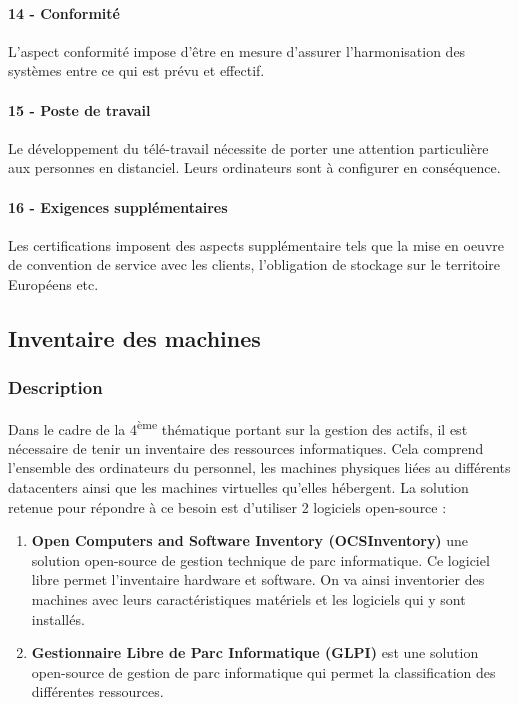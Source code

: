 \documentclass[12pt]{article}
\begin{document}
\paragraph{14 - Conformité} 
L'aspect conformité impose d'être en mesure d'assurer l'harmonisation des systèmes entre ce qui est prévu et effectif. 
\paragraph{15 - Poste de travail} 
Le développement du télé-travail nécessite de porter une attention particulière aux personnes en distanciel. 
Leurs ordinateurs sont à configurer en conséquence.
\paragraph{16 - Exigences supplémentaires} 
Les certifications imposent des aspects supplémentaire tels que la mise en oeuvre de convention de service avec les clients, l'obligation de stockage sur le territoire Européens etc.

\newpage
\subsection{Inventaire des machines}
\subsubsection{Description}

Dans le cadre de la 4\textsuperscript{ème} thématique portant sur la gestion des actifs, il est nécessaire de tenir un inventaire des ressources informatiques. 
Cela comprend l'ensemble des ordinateurs du personnel, les machines physiques liées au différents datacenters ainsi que les machines virtuelles qu'elles hébergent.
La solution retenue pour répondre à ce besoin est d'utiliser 2 logiciels open-source :
\begin{enumerate}
    \item \textbf{Open Computers and Software Inventory (OCSInventory)} une solution open-source de gestion technique de parc informatique. Ce logiciel libre permet l’inventaire hardware et software. On va ainsi inventorier des machines avec leurs caractéristiques matériels et les logiciels qui y sont installés.
    \item \textbf{Gestionnaire Libre de Parc Informatique (GLPI)} est une solution open-source de gestion de parc informatique qui permet la classification des différentes ressources.
\end{enumerate}
\end{document}

